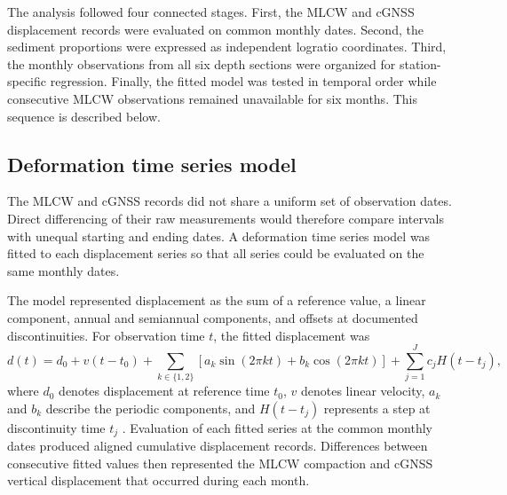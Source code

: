 The analysis followed four connected stages. First, the MLCW and cGNSS displacement records were evaluated on common monthly dates. Second, the sediment proportions were expressed as independent logratio coordinates. Third, the monthly observations from all six depth sections were organized for station-specific regression. Finally, the fitted model was tested in temporal order while consecutive MLCW observations remained unavailable for six months. This sequence is described below.

\subsection{Deformation time series model}
\label{subsec:deformation_model}

The MLCW and cGNSS records did not share a uniform set of observation dates. Direct differencing of their raw measurements would therefore compare intervals with unequal starting and ending dates. A deformation time series model was fitted to each displacement series so that all series could be evaluated on the same monthly dates.

The model represented displacement as the sum of a reference value, a linear component, annual and semiannual components, and offsets at documented discontinuities. For observation time $t$, the fitted displacement was
\begin{equation}
d(t)=d_0+v(t-t_0)
+\sum_{k\in\{1,2\}}
\left[a_k\sin(2\pi k t)+b_k\cos(2\pi k t)\right]
+\sum_{j=1}^{J}c_j H(t-t_j),
\label{eq:deformation_model}
\end{equation}
where $d_0$ denotes displacement at reference time $t_0$, $v$ denotes linear velocity, $a_k$ and $b_k$ describe the periodic components, and $H(t-t_j)$ represents a step at discontinuity time $t_j$ \citep{nikolaidis_observation_2002}. Evaluation of each fitted series at the common monthly dates produced aligned cumulative displacement records. Differences between consecutive fitted values then represented the MLCW compaction and cGNSS vertical displacement that occurred during each month.

